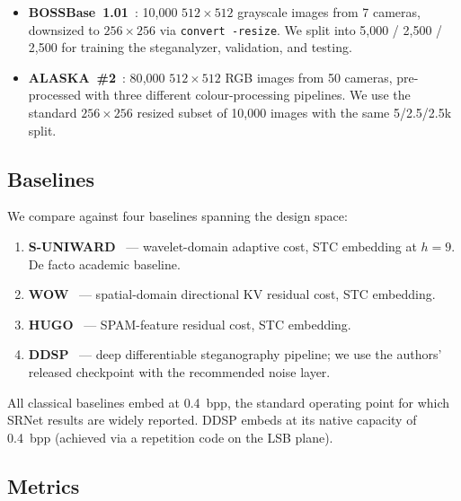 \documentclass[10pt,a4paper]{article}
\begin{document}
\begin{itemize}[leftmargin=2.2em,itemsep=1pt,topsep=2pt]
    \item \textbf{BOSSBase~1.01}~\cite{bas2011bossbase}: 10{,}000
          $512{\times}512$ grayscale images from 7 cameras, downsized
          to $256{\times}256$ via \texttt{convert -resize}.  We split
          into 5{,}000 / 2{,}500 / 2{,}500 for training the
          steganalyzer, validation, and testing.
    \item \textbf{ALASKA~\#2}~\cite{cogranne2019alaska}: 80{,}000
          $512{\times}512$ RGB images from 50 cameras, pre-processed
          with three different colour-processing pipelines.  We use the
          standard $256{\times}256$ resized subset of 10{,}000 images
          with the same 5/2.5/2.5k split.
\end{itemize}

\subsection{Baselines}
\label{sec:exp-baselines}

We compare against four baselines spanning the design space:
\begin{enumerate}[label=(\arabic*),leftmargin=2.4em,itemsep=1pt,topsep=2pt]
    \item \textbf{S-UNIWARD}~\cite{holub2014suniv} --- wavelet-domain
          adaptive cost, STC embedding at $h=9$.  De facto academic
          baseline.
    \item \textbf{WOW}~\cite{holub2012wow} --- spatial-domain
          directional KV residual cost, STC embedding.
    \item \textbf{HUGO}~\cite{pevny2010hugo} --- SPAM-feature residual
          cost, STC embedding.
    \item \textbf{DDSP}~\cite{zhou2022ddsp} --- deep differentiable
          steganography pipeline; we use the authors' released
          checkpoint with the recommended noise layer.
\end{enumerate}

All classical baselines embed at 0.4~bpp, the standard operating point
for which SRNet results are widely reported. DDSP embeds at its native
capacity of 0.4~bpp (achieved via a repetition code on the LSB plane).

\subsection{Metrics}
\label{sec:exp-metrics}
\end{document}
